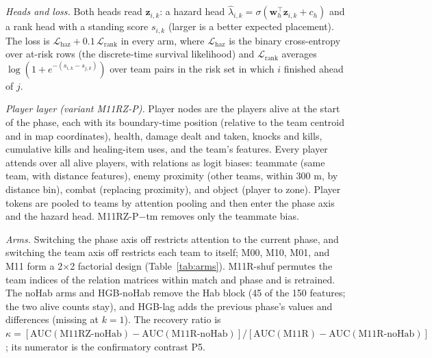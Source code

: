 \emph{Heads and loss.} Both heads read $\mathbf{z}_{i,k}$: a hazard head $\hat\lambda_{i,k}=\sigma(\mathbf{w}_h^\top\mathbf{z}_{i,k}+c_h)$ and a rank head with a standing score $s_{i,k}$ (larger is a better expected placement). The loss is $\mathcal{L}_{\mathrm{haz}}+0.1\,\mathcal{L}_{\mathrm{rank}}$ in every arm, where $\mathcal{L}_{\mathrm{haz}}$ is the binary cross-entropy over at-risk rows (the discrete-time survival likelihood) and $\mathcal{L}_{\mathrm{rank}}$ averages $\log(1+e^{-(s_{i,k}-s_{j,k})})$ over team pairs in the risk set in which $i$ finished ahead of $j$.

\emph{Player layer (variant M11RZ-P).} Player nodes are the players alive at the start of the phase, each with its boundary-time position (relative to the team centroid and in map coordinates), health, damage dealt and taken, knocks and kills, cumulative kills and healing-item uses, and the team's features. Every player attends over all alive players, with relations as logit biases: teammate (same team, with distance features), enemy proximity (other teams, within 300 m, by distance bin), combat (replacing proximity), and object (player to zone). Player tokens are pooled to teams by attention pooling and then enter the phase axis and the hazard head. M11RZ-P$-$tm removes only the teammate bias.

\begin{table}[t]
\caption{Arms and their 12-cohort mean metrics (seed 42, descriptive). Ph., Tm.: phase and team axes; Rel.: relation bias (shuf.: team-permuted relations); Zn.: safe-zone object; Hab: Zone and Habitat features without the alive counts; pl.: player layer; tm: teammate bias.}
\label{tab:arms}
\centering\scriptsize
\setlength{\tabcolsep}{2pt}
\renewcommand{\arraystretch}{1.02}
\resizebox{\columnwidth}{!}{}
\end{table}

\emph{Arms.} Switching the phase axis off restricts attention to the current phase, and switching the team axis off restricts each team to itself; M00, M10, M01, and M11 form a 2$\times$2 factorial design (Table~\ref{tab:arms}). M11R-shuf permutes the team indices of the relation matrices within match and phase and is retrained. The noHab arms and HGB-noHab remove the Hab block (45 of the 150 features; the two alive counts stay), and HGB-lag adds the previous phase's values and differences (missing at $k=1$). The recovery ratio is $\kappa=[\mathrm{AUC}(\text{M11RZ-noHab})-\mathrm{AUC}(\text{M11R-noHab})]/[\mathrm{AUC}(\text{M11R})-\mathrm{AUC}(\text{M11R-noHab})]$; its numerator is the confirmatory contrast P5.

